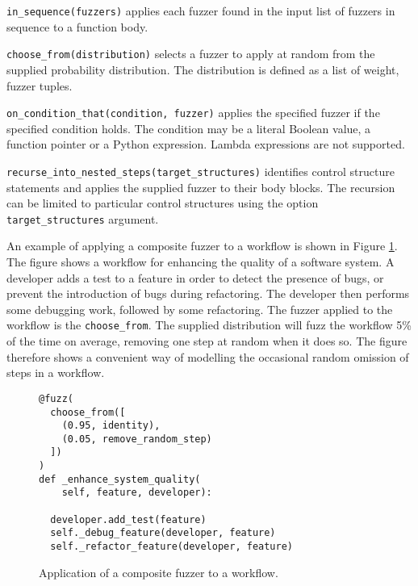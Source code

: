 \documentclass{sig-alternate}
\newenvironment{FunctionList}{%
\lstset{basicstyle=\ttfamily\bfseries\small}
\begin{list}{}{\leftmargin=5pt}
}{\end{list}\lstset{basicstyle=\ttfamily\small}}
\begin{document}
\begin{FunctionList}
\item \lstinline!in_sequence(fuzzers)! applies each fuzzer found in the input
  list of fuzzers in sequence to a function body.

\item \lstinline!choose_from(distribution)! selects a fuzzer to apply at random
  from the supplied probability distribution.  The distribution is defined as a
  list of weight, fuzzer tuples.

\item \lstinline!on_condition_that(condition, fuzzer)! %
  applies the specified fuzzer if the specified condition holds.  The condition
  may be a literal Boolean value, a function pointer or a Python expression.
  Lambda expressions are not supported.

\item \lstinline!recurse_into_nested_steps(target_structures)! identifies
  control structure statements and applies the supplied fuzzer to their body
  blocks.  The recursion can be limited to particular control structures using
  the option \lstinline!target_structures! argument.
\end{FunctionList}

An example of applying a composite fuzzer to a workflow is shown in Figure
\ref{fig:composite}.  The figure shows a workflow for enhancing the quality of a
software system.  A developer adds a test to a feature in order to detect the
presence of bugs, or prevent the introduction of bugs during refactoring.  The
developer then performs some debugging work, followed by some refactoring.  The
fuzzer applied to the workflow is the \lstinline!choose_from!.  The supplied
distribution will fuzz the workflow 5\% of the time on average, removing one
step at random when it does so.  The figure therefore shows a convenient way of
modelling the occasional random omission of steps in a workflow.

\begin{figure}
  \centering

\begin{lstlisting}
@fuzz(
  choose_from([
    (0.95, identity),
    (0.05, remove_random_step)
  ])
)
def _enhance_system_quality(
    self, feature, developer):

  developer.add_test(feature)
  self._debug_feature(developer, feature)
  self._refactor_feature(developer, feature) 
\end{lstlisting}
  
  \caption{Application of a composite fuzzer to a workflow.}
  \label{fig:composite}
\end{figure}
\end{document}
